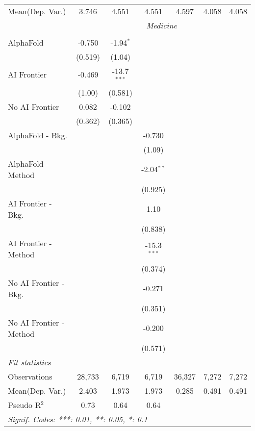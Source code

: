 \begin{tabular}{lcccccc}
Mean(Dep. Var.) & 3.746 & 4.551 & 4.551 & 4.597 & 4.058 & 4.058 \\
 & \multicolumn{6}{c}{\textit{Medicine}} \\ \\
   AlphaFold               & -0.750   & -1.94$^{*}$   &               &        &       &   \\   
                           & (0.519)  & (1.04)        &               &        &       &   \\   
   AI Frontier             & -0.469   & -13.7$^{***}$ &               &        &       &   \\   
                           & (1.00)   & (0.581)       &               &        &       &   \\   
   No AI Frontier          & 0.082    & -0.102        &               &        &       &   \\   
                           & (0.362)  & (0.365)       &               &        &       &   \\   
   AlphaFold - Bkg.        &          &               & -0.730        &        &       &   \\   
                           &          &               & (1.09)        &        &       &   \\   
   AlphaFold - Method      &          &               & -2.04$^{**}$  &        &       &   \\   
                           &          &               & (0.925)       &        &       &   \\   
   AI Frontier - Bkg.      &          &               & 1.10          &        &       &   \\   
                           &          &               & (0.838)       &        &       &   \\   
   AI Frontier - Method    &          &               & -15.3$^{***}$ &        &       &   \\   
                           &          &               & (0.374)       &        &       &   \\   
   No AI Frontier - Bkg.   &          &               & -0.271        &        &       &   \\   
                           &          &               & (0.351)       &        &       &   \\   
   No AI Frontier - Method &          &               & -0.200        &        &       &   \\   
                           &          &               & (0.571)       &        &       &   \\   
   \midrule
   \emph{Fit statistics}\\
   Observations            & 28,733   & 6,719         & 6,719         & 36,327 & 7,272 & 7,272\\  
Mean(Dep. Var.) & 2.403 & 1.973 & 1.973 & 0.285 & 0.491 & 0.491 \\
   Pseudo R$^2$            & 0.73     & 0.64          & 0.64          &        &       & \\  
   \midrule \midrule
   \multicolumn{7}{l}{\emph{Signif. Codes: ***: 0.01, **: 0.05, *: 0.1}}\\
\end{tabular}
\par\endgroup
